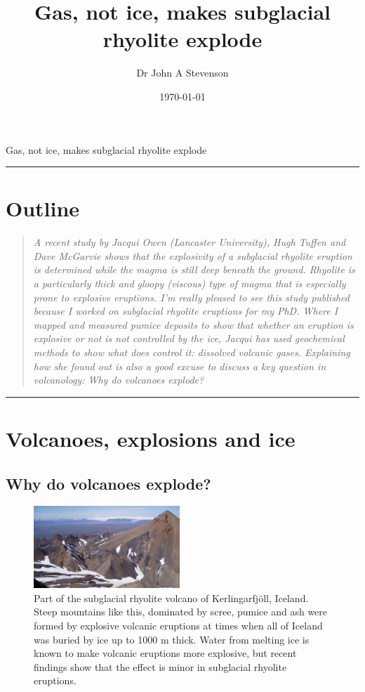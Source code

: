\documentclass[a4paper,11pt]{article}
\title{Gas, not ice, makes subglacial rhyolite explode}
\author{Dr John A Stevenson}
\date{\today}
\begin{document}
\begin{center}
	{\LARGE Gas, not ice, makes subglacial rhyolite explode}
\end{center}
\smallskip
\hrule height 1pt 

\section*{Outline}
\begin{quote}
\textit{A recent study by Jacqui Owen (Lancaster University), Hugh Tuffen and Dave McGarvie shows that the explosivity of a subglacial rhyolite eruption is determined while the magma is still deep beneath the ground. Rhyolite is a particularly thick and gloopy (viscous) type of magma that is especially prone to explosive eruptions.  I'm really pleased to see this study published because I worked on subglacial rhyolite eruptions for my PhD. Where I mapped and measured pumice deposits to show that whether an eruption is explosive or not is not controlled by the ice, Jacqui has used geochemical methods to show what does control it: dissolved volcanic gases.  Explaining how she found out is also a good excuse to discuss a key question in volcanology: Why do volcanoes explode?} 
\end{quote}
\rule{\textwidth}{1pt}

\section{Volcanoes, explosions and ice}
\subsection{Why do volcanoes explode?}

\begin{figure}
\includegraphics[width=0.49\textwidth]{figures/kerlingarfjoll.jpg}
	\caption{Part of the subglacial rhyolite volcano of Kerlingarfj\"oll, Iceland. Steep mountains like this, dominated by scree, pumice and ash were formed by explosive volcanic eruptions at times when all of Iceland was buried by ice up to 1000 m thick. Water from melting ice is known to make volcanic eruptions more explosive, but recent findings show that the effect is minor in subglacial rhyolite eruptions.}	
	\label{fig:kerlingarfjoll}
\end{figure}
\end{document}

